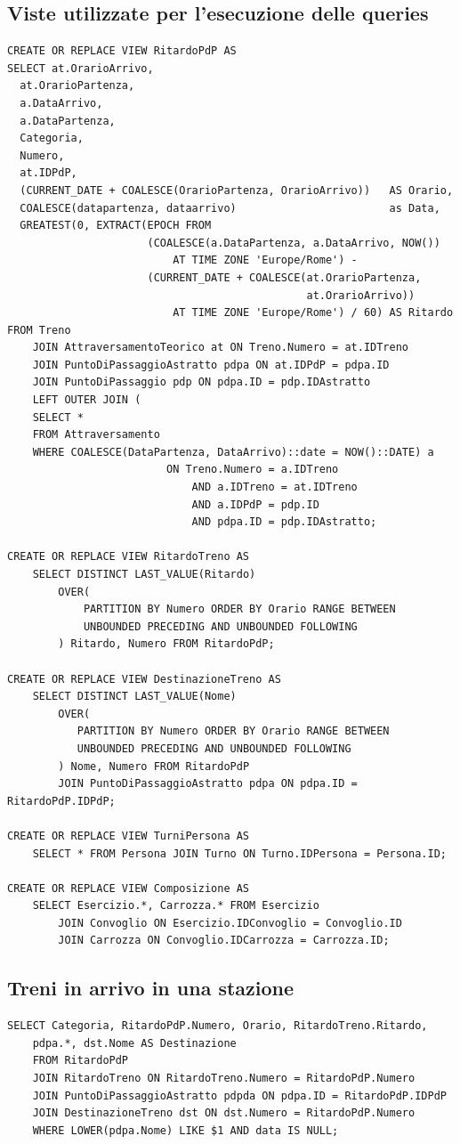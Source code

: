 \documentclass[a4paper,12pt]{report}
\begin{document}
	\subsection{Viste utilizzate per l'esecuzione delle queries}
	\begin{verbatim}
CREATE OR REPLACE VIEW RitardoPdP AS
SELECT at.OrarioArrivo,
  at.OrarioPartenza,
  a.DataArrivo,
  a.DataPartenza,
  Categoria,
  Numero,
  at.IDPdP,
  (CURRENT_DATE + COALESCE(OrarioPartenza, OrarioArrivo))   AS Orario,
  COALESCE(datapartenza, dataarrivo)                        as Data,
  GREATEST(0, EXTRACT(EPOCH FROM
                      (COALESCE(a.DataPartenza, a.DataArrivo, NOW())
                          AT TIME ZONE 'Europe/Rome') -
                      (CURRENT_DATE + COALESCE(at.OrarioPartenza,
                                               at.OrarioArrivo))
                          AT TIME ZONE 'Europe/Rome') / 60) AS Ritardo
FROM Treno
    JOIN AttraversamentoTeorico at ON Treno.Numero = at.IDTreno
    JOIN PuntoDiPassaggioAstratto pdpa ON at.IDPdP = pdpa.ID
    JOIN PuntoDiPassaggio pdp ON pdpa.ID = pdp.IDAstratto
    LEFT OUTER JOIN (
    SELECT *
    FROM Attraversamento
    WHERE COALESCE(DataPartenza, DataArrivo)::date = NOW()::DATE) a
                         ON Treno.Numero = a.IDTreno
                             AND a.IDTreno = at.IDTreno
                             AND a.IDPdP = pdp.ID
                             AND pdpa.ID = pdp.IDAstratto;

CREATE OR REPLACE VIEW RitardoTreno AS
    SELECT DISTINCT LAST_VALUE(Ritardo)
        OVER(
            PARTITION BY Numero ORDER BY Orario RANGE BETWEEN
            UNBOUNDED PRECEDING AND UNBOUNDED FOLLOWING
        ) Ritardo, Numero FROM RitardoPdP;

CREATE OR REPLACE VIEW DestinazioneTreno AS
    SELECT DISTINCT LAST_VALUE(Nome)
        OVER(
           PARTITION BY Numero ORDER BY Orario RANGE BETWEEN
           UNBOUNDED PRECEDING AND UNBOUNDED FOLLOWING
        ) Nome, Numero FROM RitardoPdP
        JOIN PuntoDiPassaggioAstratto pdpa ON pdpa.ID = RitardoPdP.IDPdP;

CREATE OR REPLACE VIEW TurniPersona AS
    SELECT * FROM Persona JOIN Turno ON Turno.IDPersona = Persona.ID;

CREATE OR REPLACE VIEW Composizione AS
    SELECT Esercizio.*, Carrozza.* FROM Esercizio
        JOIN Convoglio ON Esercizio.IDConvoglio = Convoglio.ID
        JOIN Carrozza ON Convoglio.IDCarrozza = Carrozza.ID;
	\end{verbatim}
	\subsection{Treni in arrivo in una stazione}
	\begin{verbatim}
SELECT Categoria, RitardoPdP.Numero, Orario, RitardoTreno.Ritardo,
    pdpa.*, dst.Nome AS Destinazione
    FROM RitardoPdP
    JOIN RitardoTreno ON RitardoTreno.Numero = RitardoPdP.Numero
    JOIN PuntoDiPassaggioAstratto pdpda ON pdpa.ID = RitardoPdP.IDPdP
    JOIN DestinazioneTreno dst ON dst.Numero = RitardoPdP.Numero
    WHERE LOWER(pdpa.Nome) LIKE $1 AND data IS NULL;
	\end{verbatim}
\end{document}
